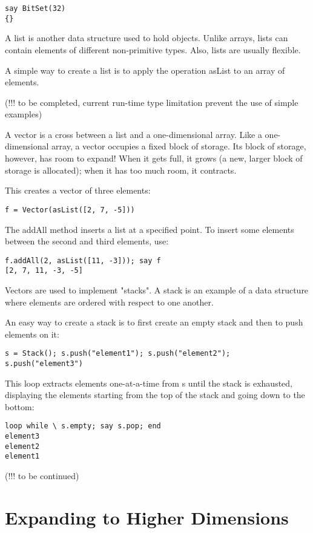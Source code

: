 \begin{verbatim}
say BitSet(32)
{}
\end{verbatim}
A list is another data structure used to hold objects. Unlike arrays, lists can contain elements of different non-primitive types. Also, lists are usually flexible.

A simple way to create a list is to apply the operation asList to an array of elements.

(!!! to be completed, current run-time type limitation prevent the use of simple examples)

A vector is a cross between a list and a one-dimensional array. Like a one-dimensional array, a vector occupies a fixed block of storage. Its block of storage, however, has room to expand! When it gets full, it grows (a new, larger block of storage is allocated); when it has too much room, it contracts.

This creates a vector of three elements:

\begin{verbatim}
f = Vector(asList([2, 7, -5]))
\end{verbatim}
The addAll method inserts a list at a specified point. To insert some elements between the second and third elements, use:

\begin{verbatim}
f.addAll(2, asList([11, -3])); say f
[2, 7, 11, -3, -5]
\end{verbatim}
Vectors are used to implement "stacks". A stack is an example of a data structure where elements are ordered with respect to one another.

An easy way to create a stack is to first create an empty stack and then to push elements on it:

\begin{verbatim}
s = Stack(); s.push("element1"); s.push("element2"); s.push("element3")
\end{verbatim}
This loop extracts elements one-at-a-time from s until the stack is exhausted, displaying the elements starting from the top of the stack and going down to the bottom:
\begin{verbatim}
loop while \ s.empty; say s.pop; end
element3
element2
element1
\end{verbatim}
(!!! to be continued)

\section{Expanding to Higher Dimensions}

